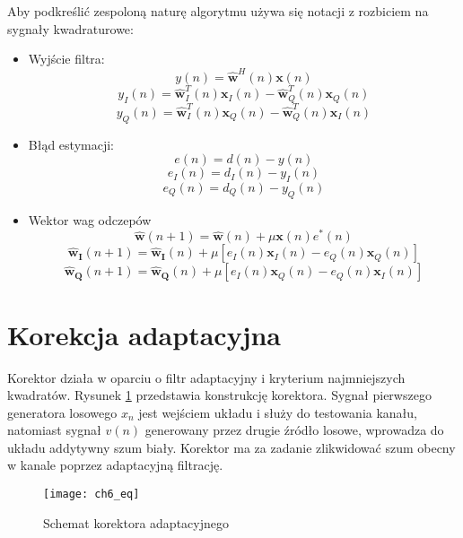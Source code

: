 Aby podkreślić zespoloną naturę algorytmu używa się notacji z rozbiciem na sygnały kwadraturowe:
\begin{itemize}
\item Wyjście filtra:
\begin{equation} \label{eq:yn}
y(n) = \bm{\hat{w}}^H(n) \bm{x}(n)
\end{equation}
\begin{equation}
y_I(n) = \bm{\hat{w}}_I^T(n) \bm{x}_I(n) - \bm{\hat{w}}_Q^T(n) \bm{x}_Q(n)
\end{equation}
\begin{equation}
y_Q(n) = \bm{\hat{w}}_I^T(n) \bm{x}_Q(n) - \bm{\hat{w}}_Q^T(n) \bm{x}_I(n)
\end{equation}
\item Błąd estymacji:
\begin{equation}
e(n) = d(n) - y(n)
\end{equation}
\begin{equation}
e_I(n) = d_I(n) - y_I(n)
\end{equation}
\begin{equation}
e_Q(n) = d_Q(n) - y_Q(n)
\end{equation}
\item Wektor wag odczepów
\begin{equation}
\bm{\hat{w}}(n+1) = \bm{\hat{w}}(n) + \mu \bm{x}(n)e^*(n)
\end{equation}
\begin{equation}
\bm{\hat{w}_I}(n+1) = \bm{\hat{w}_I}(n) + \mu [e_I(n) \bm{x}_I(n) - e_Q(n) \bm{x}_Q(n)]
\end{equation}
\begin{equation}
\bm{\hat{w}_Q}(n+1) = \bm{\hat{w}_Q}(n) + \mu [e_I(n) \bm{x}_Q(n) - e_Q(n) \bm{x}_I(n)]
\end{equation}
\end{itemize}

\section{Korekcja adaptacyjna}

Korektor działa w oparciu o filtr adaptacyjny i kryterium najmniejszych kwadratów.
Rysunek \ref{fig:eq} przedstawia konstrukcję korektora.
Sygnał pierwszego generatora losowego $x_n$ jest wejściem układu i służy do testowania kanału, natomiast sygnał $v(n)$ generowany przez drugie źródło losowe, wprowadza do układu addytywny szum biały. 
Korektor ma za zadanie zlikwidować szum obecny w kanale poprzez adaptacyjną filtrację.

\begin{figure}[ht]
\centering
\texttt{[image: ch6\_eq]}
\caption{Schemat korektora adaptacyjnego}
\label{fig:eq}
\end{figure}
